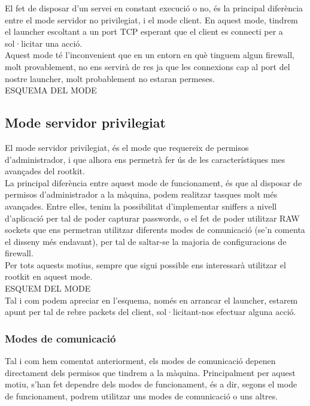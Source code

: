El fet de disposar d'un servei en constant execució o no, és la principal diferència entre el mode servidor
no privilegiat, i el mode client. En aquest mode, tindrem el launcher escoltant a un port TCP esperant que
el client es connecti per a sol·licitar una acció. \\

Aquest mode té l'inconvenient que en un entorn en què tinguem algun firewall, molt provablement, no ens 
servirà de res ja que les connexions cap al port del nostre launcher, molt probablement no estaran permeses. \\

ESQUEMA DEL MODE \\

\subsection{Mode servidor privilegiat}

El mode servidor privilegiat, és el mode que requereix de permisos d'administrador, i que alhora ens permetrà
fer ús de les característiques mes avançades del rootkit. \\

La principal diferència entre aquest mode de funcionament, és que al disposar de permisos d'administrador a
la màquina, podem realitzar tasques molt més avançades. Entre elles, tenim la possibilitat d'implementar 
sniffers a nivell d'aplicació per tal de poder capturar passwords, o el fet de poder utilitzar RAW sockets que
ens permetran utilitzar diferents modes de comunicació (se'n comenta el disseny més endavant), per tal de 
saltar-se la majoria de configuracions de firewall. \\

Per tots aquests motius, sempre que sigui possible ens interessarà utilitzar el rootkit en aquest mode. \\

ESQUEM DEL MODE \\

Tal i com podem apreciar en l'esquema, només en arrancar el launcher, estarem apunt per tal de rebre packets
del client, sol·licitant-nos efectuar alguna acció. \\

\subsubsection{Modes de comunicació}

Tal i com hem comentat anteriorment, els modes de comunicació depenen directament dels permisos que tindrem 
a la màquina. Principalment per aquest motiu, s'han fet dependre dels modes de funcionament, és a dir, segons el
mode de funcionament, podrem utilitzar uns modes de comunicació o uns altres. \\

